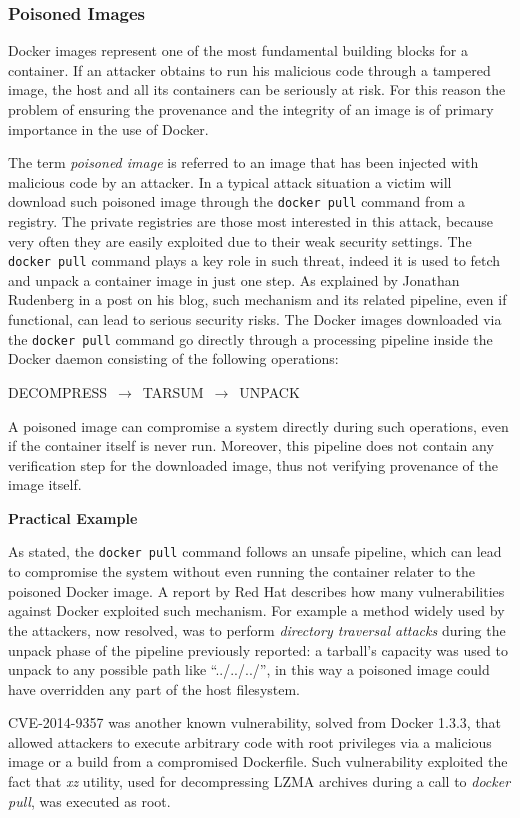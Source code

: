 \documentclass[a4paper,12pt]{article}
\newcommand{\code}[1]{\lstinline|#1|}
\begin{document}
\subsubsection{Poisoned Images}

Docker images represent one of the most fundamental building blocks for a
container. If an attacker obtains to run his malicious code through a tampered image, the host
and all its containers can be seriously at risk. For this reason the problem of
ensuring the provenance and the integrity of an image is of primary importance in the use of
Docker. \par The term \textit{poisoned image} is referred to an image that has
been injected with malicious code by an attacker. In a typical attack
situation a victim will download such poisoned image through the \code{docker
pull} command from a registry. The private registries are those most interested
in this attack, because very often they are easily exploited due to their weak
security settings. The \code{docker pull} command plays a key role in such
threat, indeed it is used to fetch and unpack a container image in just one
step. As explained by Jonathan Rudenberg in a post
\cite{docker_image_insecurity} on his blog, such mechanism and its related
pipeline, even if functional, can lead to serious security risks. The Docker
images downloaded via the \code{docker pull} command go directly through a
processing pipeline inside the Docker daemon consisting of the following
operations: \bigbreak\centerline{DECOMPRESS $\,\to\,$ TARSUM $\,\to\,$
UNPACK}\bigbreak A poisoned image can compromise a system directly during such
operations, even if the container itself is never run. Moreover, this pipeline
does not contain any verification step for the downloaded image, thus not
verifying provenance of the image itself. 

\bigbreak\textbf{Practical Example}\bigbreak 

As stated, the \code{docker pull} command follows an unsafe pipeline, which
can lead to compromise the system without even running the container relater to
the poisoned Docker image. A report by Red Hat \cite{docker_pull_red_hat}
describes how many vulnerabilities against Docker exploited such mechanism. For
example a method widely used by the attackers, now resolved, was to perform
\textit{directory traversal attacks} during the unpack phase of the pipeline
previously reported: a tarball's capacity was used to unpack to any possible
path like ``../../../'', in this way a poisoned image could have overridden any
part of the host filesystem. \par CVE-2014-9357 \cite{CVE-2014-9357} was another
known vulnerability, solved from Docker 1.3.3, that allowed attackers to execute
arbitrary code with root privileges via a malicious image or a build from a
compromised Dockerfile. Such vulnerability exploited the fact that \textit{xz}
utility, used for decompressing LZMA archives during a call to \textit{docker
pull}, was executed as root. 
\end{document}
